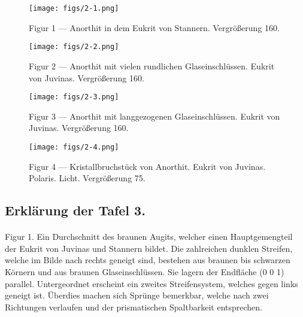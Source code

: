\documentclass[a4paper, 11pt, oneside, polutonikogreek, german]{article}
\begin{document}
\vspace*{\fill}
\begin{figure}[H]
\centering
\texttt{[image: figs/2-1.png]}
\caption{\small Figur 1 --- Anorthit in dem Eukrit von Stannern. Vergrößerung 160.}
\end{figure}
\vspace*{\fill}
\clearpage

\vspace*{\fill}
\begin{figure}[H]
\centering
\texttt{[image: figs/2-2.png]}
\caption{\small Figur 2 --- Anorthit mit vielen rundlichen Glaseinschlüssen. Eukrit von Juvinas. Vergrößerung 160.}
\end{figure}
\vspace*{\fill}
\clearpage

\vspace*{\fill}
\begin{figure}[H]
\centering
\texttt{[image: figs/2-3.png]}
\caption{\small Figur 3 --- Anorthit mit langgezogenen Glaseinschlüssen. Eukrit von Juvinas. Vergrößerung 160.}
\end{figure}
\vspace*{\fill}
\clearpage

\vspace*{\fill}
\begin{figure}[H]
\centering
\texttt{[image: figs/2-4.png]}
\caption{\small Figur 4 --- Kristallbruchstück von Anorthit. Eukrit von Juvinas. Polaris. Licht. Vergrößerung 75.}
\end{figure}
\vspace*{\fill}
\clearpage

\subsection{Erklärung der Tafel 3.}
\paragraph{}
Figur 1. Ein Durchschnitt des braunen Augits, welcher einen Hauptgemengteil der Eukrit von Juvinas und Stannern bildet. Die zahlreichen dunklen Streifen, welche im Bilde nach rechts geneigt sind, bestehen aus braunen bis schwarzen Körnern und aus braunen Glaseinschlüssen. Sie lagern der Endfläche (0 0 1) parallel. Untergeordnet erscheint ein zweites Streifensystem, welches gegen links geneigt ist. Überdies machen sich Sprünge bemerkbar, welche nach zwei Richtungen verlaufen und der prismatischen Spaltbarkeit entsprechen.
\end{document}
